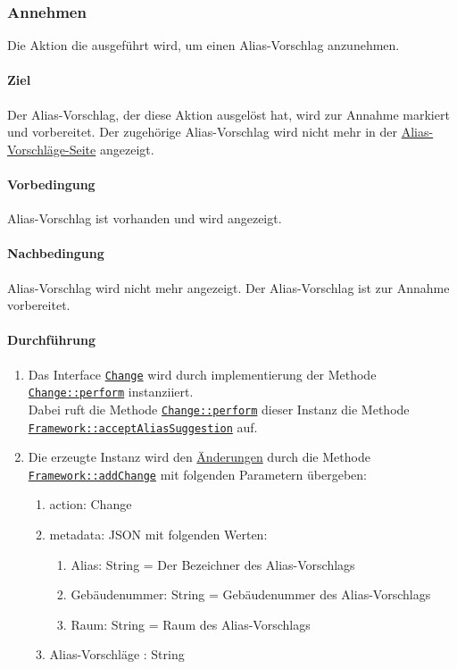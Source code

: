 \subsubsection{Annehmen}\label{AP_Aktionen_Alias_Vorschlage_Annehmen}

Die Aktion die ausgeführt wird, um einen Alias-Vorschlag anzunehmen.

\paragraph*{Ziel}
Der Alias-Vorschlag, der diese Aktion ausgelöst hat, wird zur Annahme markiert und vorbereitet.
Der zugehörige Alias-Vorschlag wird nicht mehr in der \hyperref[AP_Alias_Vorschlage]{Alias-Vorschläge-Seite} angezeigt.

\paragraph*{Vorbedingung}
Alias-Vorschlag ist vorhanden und wird angezeigt.

\paragraph*{Nachbedingung}
Alias-Vorschlag wird nicht mehr angezeigt. Der Alias-Vorschlag ist zur Annahme vorbereitet.

\paragraph*{Durchführung}
\begin{enumerate}
    \item Das Interface \hyperref[AP_Change]{\texttt{Change}} wird durch implementierung der Methode \hyperref[AP_Change_perform]{\texttt{Change::perform}} instanziiert. \\
          Dabei ruft die Methode \hyperref[AP_Change_perform]{\texttt{Change::perform}} dieser Instanz die Methode \\
          \hyperref[AP_Framework_acceptAliasSuggestion]{\texttt{Framework::acceptAliasSuggestion}} auf.
    \item Die erzeugte Instanz wird den \hyperref[AP_Changes]{Änderungen} durch die Methode \hyperref[AP_Framework_addChange]{\texttt{Framework::addChange}} mit folgenden Parametern übergeben: \begin{enumerate}
        \item action: Change
        \item metadata: JSON mit folgenden Werten: \begin{enumerate}
            \item Alias: String = Der Bezeichner des Alias-Vorschlags
            \item Gebäudenummer: String = Gebäudenummer des Alias-Vorschlags
            \item Raum: String = Raum des Alias-Vorschlags
        \end{enumerate}
        \item \dq Alias-Vorschläge \dq: String
    \end{enumerate}
\end{enumerate}